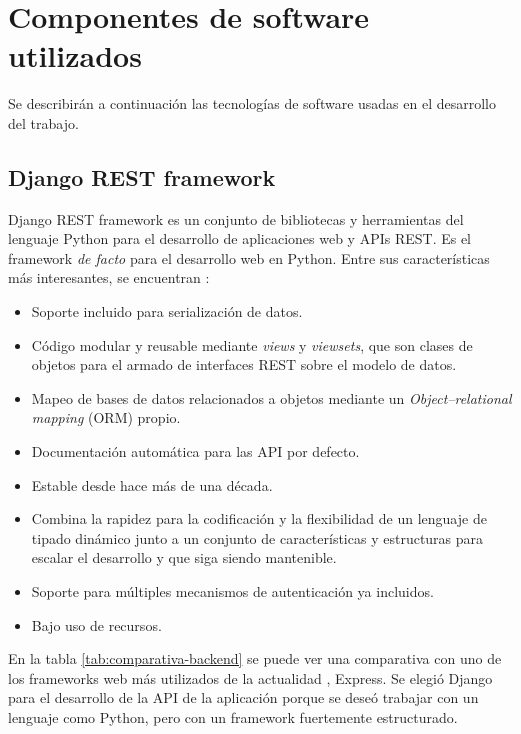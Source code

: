 \section{Componentes de software utilizados}

Se describirán a continuación las tecnologías de software usadas en el desarrollo del trabajo.

\subsection{Django REST framework}

Django REST framework es un conjunto de bibliotecas y herramientas del lenguaje Python para el desarrollo de aplicaciones web y APIs REST. Es el framework \textit{de facto} para el desarrollo web en Python. Entre sus características más interesantes, se encuentran \citep{DJANGO:1}:
\begin{itemize}
	\item Soporte incluido para serialización de datos.
	\item Código modular y reusable mediante \textit{views} y \textit{viewsets}, que son clases de objetos para el armado de interfaces REST sobre el modelo de datos.
	\item Mapeo de bases de datos relacionados a objetos mediante un \textit{Object–relational mapping} (ORM) propio.
	\item Documentación automática para las API por defecto.
	\item Estable desde hace más de una década.
	\item Combina la rapidez para la codificación y la flexibilidad de un lenguaje de tipado dinámico junto a un conjunto de características y estructuras para escalar el desarrollo y que siga siendo mantenible.
	\item Soporte para múltiples mecanismos de autenticación ya incluidos.
	\item Bajo uso de recursos.
\end{itemize}

En la tabla \ref{tab:comparativa-backend} se puede ver una comparativa con uno de los frameworks web más utilizados de la actualidad \citep{EXPRESS:1}, Express. Se elegió Django para el desarrollo de la API de la aplicación porque se deseó trabajar con un lenguaje como Python, pero con un framework fuertemente estructurado.

